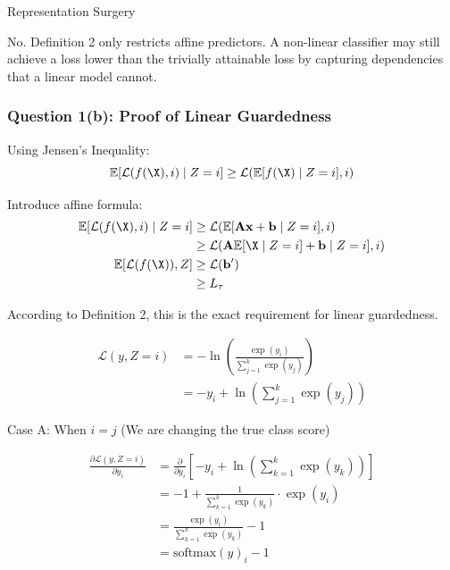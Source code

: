 \begin{question}{Representation Surgery}

\begin{subquestion}
No. Definition 2 only restricts affine predictors. A non-linear classifier may still achieve a loss lower than the trivially attainable loss by capturing dependencies that a linear model cannot.
\end{subquestion}

\begin{subquestion}

\subsubsection*{Question 1(b): Proof of Linear Guardedness}

Using Jensen's Inequality:
\[ \mathbb{E}[\mathcal{L}(f(\X), i) \mid Z=i] \geq \mathcal{L}(\mathbb{E}[f(\X) \mid Z=i], i) \]

Introduce affine formula:
\begin{align*}
\mathbb{E}[\mathcal{L}(f(\X), i) \mid Z=i] &\geq \mathcal{L}(\mathbb{E}[\mathbf{Ax} + \mathbf{b} \mid Z=i], i) \\
&\geq \mathcal{L}(\mathbf{A}\mathbb{E}[\X \mid Z=i] + \mathbf{b} \mid Z=i], i) \\
\mathbb{E}[\mathcal{L}(f(\X)), Z] &\geq \mathcal{L}(\mathbf{b'}) \\
&\geq L_{\tau}
\end{align*}

According to Definition 2, this is the exact requirement for linear guardedness.

\end{subquestion}

\begin{subquestion}

\begin{align*}
\mathcal{L}(y, Z=i) &= -\ln \left( \frac{\exp(y_i)}{\sum_{j=1}^{k} \exp(y_j)} \right) \\
&= -y_i + \ln \left( \sum_{j=1}^{k} \exp(y_j) \right)
\end{align*}

Case A: When $i = j$ (We are changing the true class score)

\begin{align*}
\frac{\partial \mathcal{L}(y, Z=i)}{\partial y_i} &= \frac{\partial}{\partial y_i} \left[ -y_i + \ln\left(\sum_{k=1}^k \exp(y_k)\right) \right] \\
&= -1 + \frac{1}{\sum_{k=1}^k \exp(y_k)} \cdot \exp(y_i) \\
&= \frac{\exp(y_i)}{\sum_{k=1}^k \exp(y_k)} - 1 \\
&= \text{softmax}(y)_i - 1
\end{align*}


\end{subquestion}
\end{question}
